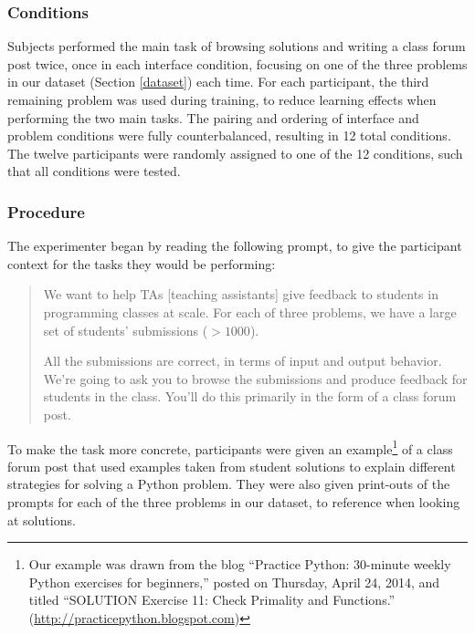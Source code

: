 \documentclass[12pt,twoside]{mitthesis}
\providecommand{\DIFaddtex}[1]{{\protect\color{blue}\uwave{#1}}} %
\providecommand{\DIFaddbegin}{} %
\providecommand{\DIFaddend}{} %
\providecommand{\DIFdelbegin}{} %
\providecommand{\DIFdelend}{} %
\providecommand{\DIFadd}[1]{\texorpdfstring{\DIFaddtex{#1}}{#1}} %
\begin{document}
{{{{{{{{{{\DIFaddbegin \subsubsection{Conditions}

\DIFaddend Subjects performed the main task of browsing solutions and writing a class forum post twice, once in each interface condition, focusing on one of the three problems in our dataset (Section \ref{dataset}) each time. For each participant, the third remaining problem was used during training, to reduce learning effects when performing the two main tasks. The pairing and ordering of interface and problem conditions were fully counterbalanced, resulting in 12 total conditions. The twelve participants were randomly assigned to one of the 12 conditions, such that all conditions were tested.

\DIFdelbegin %
\DIFdelend \DIFaddbegin \subsubsection{Procedure}
\DIFaddend 

\DIFdelbegin %
\DIFdelend \DIFaddbegin {\bf \DIFadd{Prompt}} \DIFaddend The experimenter began by reading the following prompt, to give the participant context for the tasks they would be performing:

\begin{quote}

We want to help TAs [teaching assistants] give feedback to students in programming classes at scale. For each of three problems, we have a large set of students' submissions ($> 1000$). 

All the submissions are correct, in terms of input and output behavior. We're going to ask you to browse the submissions and produce feedback for students in the class. You'll do this primarily in the form of a class forum post.
\end{quote}

To make the task more concrete, participants were given an example\footnote{Our example was drawn from the blog ``Practice Python: 30-minute weekly Python exercises for beginners,'' posted on Thursday, April 24, 2014, and titled ``SOLUTION Exercise 11: Check Primality and Functions.'' (\url{http://practicepython.blogspot.com})} of a class forum post that used examples taken from student solutions to explain different strategies for solving a Python problem. They were also given print-outs of the prompts for each of the three problems in our dataset, to reference when looking at solutions.
\DIFdelbegin %
\DIFdelend 

}}}}}}}}}}
\end{document}
